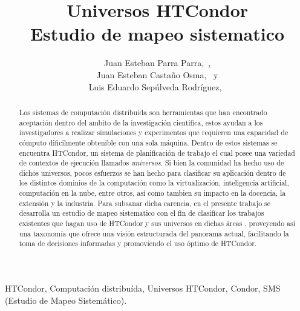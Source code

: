 \documentclass[journal]{IEEEtran}
\begin{document}
\title{
	Universos HTCondor\\
	Estudio de mapeo sistematico
}

\author{
	Juan Esteban Parra Parra,~, \\
	Juan Esteban Castaño Osma,~ y \\
	Luis Eduardo Sepúlveda Rodríguez,~
}



\maketitle

\begin{abstract}
	Los sistemas de computación distribuida son herramientas que han encontrado aceptación dentro del ambito de la investigación cientifica,
	estos ayudan a los investigadores a realizar simulaciones y experimentos que requieren una capacidad de cómputo
	dificilmente obtenible con una sola máquina. Dentro de estos sistemas se encuentra HTCondor, un sistema de planificación de trabajo el cual posee una
	variedad de contextos de ejecución llamados  \textit{universos}. Si bien la comunidad ha hecho uso de dichos universos,
	pocos esfuerzos se han hecho para clasificar su aplicación dentro de los distintos dominios de la computación como
	la virtualización, inteligencia artificial, computación en la nube, entre otros,
	así como tambien su impacto en la docencia, la extensión y la industria. Para subsanar dicha carencia, en el presente
	trabajo se desarrolla un estudio de mapeo sistematico con el fin de clasificar los trabajos existentes que hagan uso de HTCondor y sus universos
	en dichas áreas , proveyendo así una taxonomía que ofrece una visión estructurada del panorama actual,
	facilitando la toma de decisiones informadas y promoviendo el uso óptimo de HTCondor.

\end{abstract}


\begin{IEEEkeywords}
	HTCondor, Computación distribuída, Universos HTCondor, Condor, SMS (Estudio de Mapeo Sistemático).
\end{IEEEkeywords}
\end{document}
